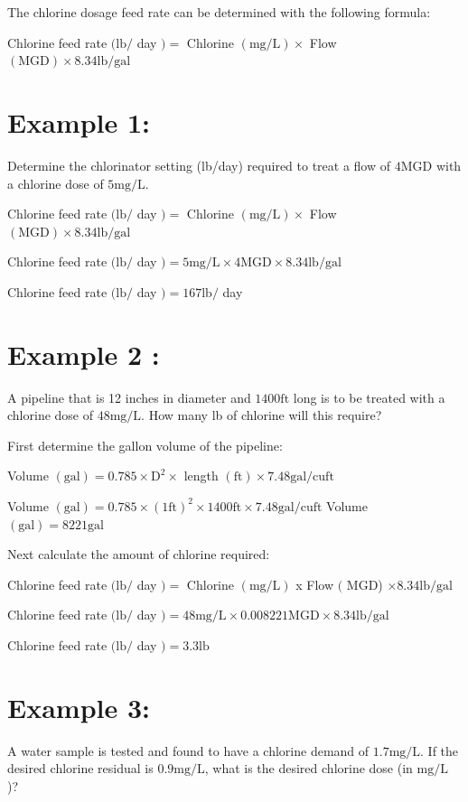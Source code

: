 \documentclass[10pt]{article}
\begin{document}
The chlorine dosage feed rate can be determined with the following formula:

Chlorine feed rate $(\mathrm{lb} /$ day $)=$ Chlorine $(\mathrm{mg} / \mathrm{L}) \times$ Flow $(\mathrm{MGD}) \times 8.34 \mathrm{lb} / \mathrm{gal}$

\section{Example 1:}
Determine the chlorinator setting (lb/day) required to treat a flow of $4 \mathrm{MGD}$ with a chlorine dose of $5 \mathrm{mg} / \mathrm{L}$.

Chlorine feed rate $(\mathrm{lb} /$ day $)=$ Chlorine $(\mathrm{mg} / \mathrm{L}) \times$ Flow $(\mathrm{MGD}) \times 8.34 \mathrm{lb} / \mathrm{gal}$

Chlorine feed rate $(\mathrm{lb} /$ day $)=5 \mathrm{mg} / \mathrm{L} \times 4 \mathrm{MGD} \times 8.34 \mathrm{lb} / \mathrm{gal}$

Chlorine feed rate $(\mathrm{lb} /$ day $)=167 \mathrm{lb} /$ day

\section{Example 2 :}
A pipeline that is 12 inches in diameter and $1400 \mathrm{ft}$ long is to be treated with a chlorine dose of $48 \mathrm{mg} / \mathrm{L}$. How many lb of chlorine will this require?

First determine the gallon volume of the pipeline:

Volume $(\mathrm{gal})=0.785 \times \mathrm{D}^{2} \times$ length $(\mathrm{ft}) \times 7.48 \mathrm{gal} / \mathrm{cu} \mathrm{ft}$

Volume $(\mathrm{gal})=0.785 \times(1 \mathrm{ft})^{2} \times 1400 \mathrm{ft} \times 7.48 \mathrm{gal} / \mathrm{cu} \mathrm{ft}$ Volume $(\mathrm{gal})=8221 \mathrm{gal}$

Next calculate the amount of chlorine required:

Chlorine feed rate $(\mathrm{lb} /$ day $)=$ Chlorine $(\mathrm{mg} / \mathrm{L})$ x Flow $($ MGD) $\times 8.34 \mathrm{lb} / \mathrm{gal}$

Chlorine feed rate $(\mathrm{lb} /$ day $)=48 \mathrm{mg} / \mathrm{L} \times 0.008221 \mathrm{MGD} \times 8.34 \mathrm{lb} / \mathrm{gal}$

Chlorine feed rate $(\mathrm{lb} /$ day $)=3.3 \mathrm{lb}$

\section{Example 3:}
A water sample is tested and found to have a chlorine demand of $1.7 \mathrm{mg} / \mathrm{L}$. If the desired chlorine residual is $0.9 \mathrm{mg} / \mathrm{L}$, what is the desired chlorine dose (in $\mathrm{mg} / \mathrm{L}$ )?
\end{document}
